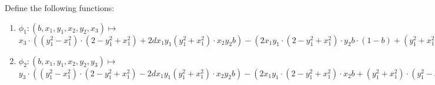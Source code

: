 Define the following functions:
\begin{enumerate}
	\item $\phi_1: (b, x_1, y_1, x_2, y_2, x_3) \mapsto $ \\
$x_3 \cdot ((y_1^2 - x_1^2)\cdot(2 - y_1^2 + x_1^2) + 2dx_1y_1(y_1^2+x_1^2) \cdot x_2y_2b ) - (2x_1y_1\cdot(2 - y_1^2 +x_1^2)\cdot y_2b \cdot (1 - b) + (y_1^2 + x_1^2)\cdot(y_1^2 - x_1^2)\cdot x_2 b)$

	\item $\phi_2: (b, x_1, y_1, x_2, y_2, y_3) \mapsto $ \\
$y_3 \cdot ((y_1^2 - x_1^2)\cdot(2 - y_1^2 + x_1^2) - 2dx_1y_1(y_1^2+x_1^2) \cdot x_2y_2b ) - (2x_1y_1\cdot(2 - y_1^2 +x_1^2)\cdot x_2b + (y_1^2 + x_1^2)\cdot(y_1^2 - x_1^2)\cdot y_2b \cdot (1 - b))$
\end{enumerate}

